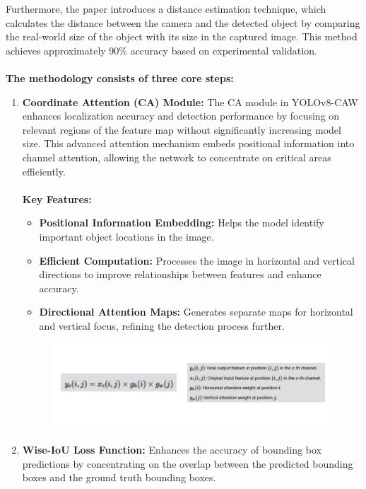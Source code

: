 {%
Furthermore, the paper introduces a distance estimation technique, which calculates the distance between the camera and the detected object by comparing the real-world size of the object with its size in the captured image. This method achieves approximately 90\% accuracy based on experimental validation.\\\\
%
\textbf{The methodology consists of three core steps:}
\begin{enumerate}
  \item \textbf{Coordinate Attention (CA) Module:} The CA module in YOLOv8-CAW enhances localization accuracy and detection performance by focusing on relevant regions of the feature map without significantly increasing model size. This advanced attention mechanism embeds positional information into channel attention, allowing the network to concentrate on critical areas efficiently.
\\\\
\textbf{Key Features:}
\begin{itemize}
    \item \textbf{Positional Information Embedding:} Helps the model identify important object locations in the image.
    \item \textbf{Efficient Computation:} Processes the image in horizontal and vertical directions to improve relationships between features and enhance accuracy.
    \item \textbf{Directional Attention Maps:} Generates separate maps for horizontal and vertical focus, refining the detection process further.\\
\end{itemize}
%  
\begin{figure}[h!]
    \centering
    \includegraphics[width=1\textwidth]{images/CA Eqn.png}
\end{figure}
%
  \item \textbf{Wise-IoU Loss Function:} Enhances the accuracy of bounding box predictions by concentrating on the overlap between the predicted bounding boxes and the ground truth bounding boxes.\\\\

\end{enumerate}}
